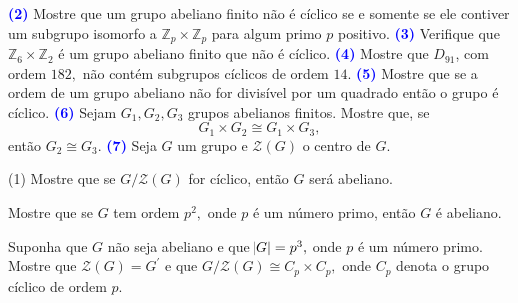 \documentclass[12pt, a4paper]{article}
\newcommand{\negrito}[1]{\mbox{\boldmath{$#1$}}}
\begin{document}
\textcolor{blue}{\bf(2)}\label{94} Mostre que um grupo abeliano finito não é cíclico se e somente se ele contiver um subgrupo isomorfo a $\mathbb{Z}_p \times \mathbb{Z}_p$ para algum primo $p$ positivo.
\newline\newline
\textcolor{blue}{\bf(3)}\label{95} Verifique que $\mathbb{Z}_6 \times \mathbb{Z}_2$ é um grupo abeliano finito que não é cíclico.
\newline\newline
\textcolor{blue}{\bf(4)}\label{96}  Mostre que $D_{91}$, com ordem $182,$ não contém subgrupos cíclicos de ordem $14.$
\newline\newline
\textcolor{blue}{\bf(5)}\label{97} Mostre que se a ordem de um grupo abeliano não for divisível por um quadrado então o grupo é cíclico.
\newline\newline
\textcolor{blue}{\bf(6)}\label{98} Sejam $G_1, G_2, G_3$ grupos abelianos finitos. Mostre que, se
\[
G_1 \times G_2 \cong G_1 \times G_3,
\]
então $G_2 \cong G_3.$
\newline\newline
\textcolor{blue}{\bf(7)}\label{99} Seja $G$ um grupo e $\mathcal{Z}(G)$ o centro de $G.$
\begin{tasks}[counter-format={(tsk[a])},label-width=3.6ex, label-format = {\bfseries}, column-sep = {0pt}](1)
\task[\textcolor{Floresta}{$\negrito{(a)} $}] Mostre que se $G / \mathcal{Z}(G)$ for cíclico, então $G$ será abeliano.

\task[\textcolor{Floresta}{$\negrito{(b)} $}] Mostre que se $G$ tem ordem $p^2,$ onde $p$ é um número primo, então $G$ é abeliano.

\task[\textcolor{Floresta}{$\negrito{(c)} $}] Suponha que $G$ não seja abeliano e que $\abs{G} = p^3,$ onde $p$ é um número primo. Mostre que $\mathcal{Z}(G) = G^{\prime}$ e que $G / \mathcal{Z}(G) \cong C_p \times C_p,$ onde $C_p$ denota o grupo cíclico de ordem $p.$
 \end{tasks}
 \newpage
\end{document}
